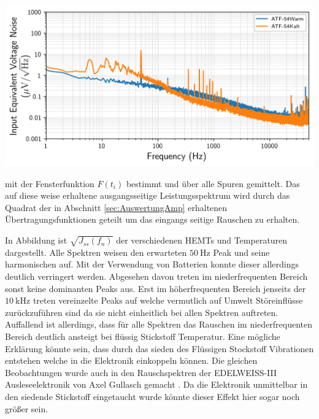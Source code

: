 \begin{minipage}[!c]{\textwidth}
\begin{minipage}[c]{\textwidth}
\includegraphics[width=\textwidth]{./fig/Rauschen/F54Warm.png}
\vspace{-0.45cm}
\label{subfig:33}
\end{minipage}

\vspace{-0.4cm}
\label{fig:RauschenOpen}
\end{minipage}

mit der Fensterfunktion $F(t_i)$ bestimmt und über alle Spuren gemittelt.
Das auf diese weise erhaltene ausgangsseitige Leistungsspektrum wird durch das Quadrat der in Abschnitt \ref{sec:AuswertungAmp} erhaltenen Übertragungsfunktionen geteilt um das eingangs seitige Rauschen zu erhalten.

In Abbildung  ist $\sqrt{J_{ss}(f_n)}$ der verschiedenen HEMTs und Temperaturen dargestellt.
Alle Spektren weisen den erwarteten $\SI{50}{\hertz}$ Peak und seine harmonischen auf.
Mit der Verwendung von Batterien konnte dieser allerdings deutlich verringert werden.
Abgesehen davon treten im niederfrequenten Bereich sonst keine dominanten Peaks aus.
Erst im höherfrequenten Bereich jenseits der $\SI{10}{\kilo\hertz}$ treten vereinzelte Peaks auf welche vermutlich auf Umwelt Störeinflüsse zurückzuführen sind da sie nicht einheitlich bei allen Spektren auftreten.
Auffallend ist allerdings, dass für alle Spektren das Rauschen im niederfrequenten Bereich deutlich ansteigt bei flüssig Stickstoff Temperatur.
Eine mögliche Erklärung könnte sein, dass durch das sieden des Flüssigen Stockstoff Vibrationen entstehen welche in die Elektronik einkoppeln können.
Die gleichen Beobachtungen wurde auch in den Rauschspektren der EDELWEISS-III Ausleseelektronik von Axel Gullasch gemacht \cite{Gullasch2015}.
Da die Elektronik unmittelbar in den siedende Stickstoff eingetaucht wurde könnte dieser Effekt hier sogar noch größer sein.

